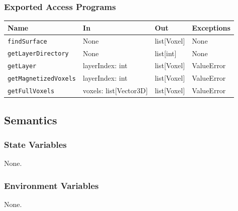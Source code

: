 \documentclass[12pt, titlepage]{article}
\begin{document}
\subsubsection{Exported Access Programs}
\begin{center}
\renewcommand{\arraystretch}{1.3}
\begin{tabular}{p{4cm} p{4.5cm} p{3.5cm} p{3.5cm}}
\toprule
\textbf{Name} & \textbf{In} & \textbf{Out} & \textbf{Exceptions} \\
\midrule
\texttt{findSurface} & None & list[Voxel] & None \\
\texttt{getLayerDirectory} & None & list[int] & None \\
\texttt{getLayer} & layerIndex: int & list[Voxel] & ValueError \\
\texttt{getMagnetizedVoxels} & layerIndex: int & list[Voxel] & ValueError \\
\texttt{getFullVoxels} & voxels: list[Vector3D] & list[Voxel] & ValueError \\

\bottomrule
\end{tabular}
\end{center}

\subsection{Semantics}

\subsubsection{State Variables}
None.

\subsubsection{Environment Variables}
None.
\end{document}
